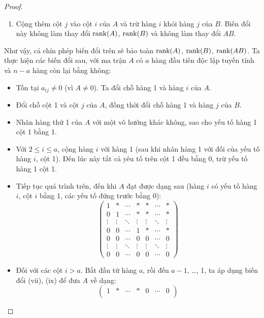 \documentclass[class=linear-algebra,crop=false]{standalone}
\begin{document}
\begin{proof}
\begin{enumerate}[label = (\roman*)]
		\item Cộng thêm cột $j$ vào cột $i$ của $A$ và trừ hàng $i$ khỏi hàng $j$ của $B$. Biến đổi này không làm thay đổi $\text{rank}(A)$, $\text{rank}(B)$ và không làm thay đổi $AB$.
	\end{enumerate}
	\par Như vậy, cả chín phép biến đổi trên sẽ bảo toàn $\text{rank}(A)$, $\text{rank}(B)$, $\text{rank}(AB)$. Ta thực hiện các biến đổi sau, với ma trận $A$ có $a$ hàng đầu tiên độc lập tuyến tính và $n - a$ hàng còn lại bằng không:
	\begin{itemize}
		\item Tồn tại $a_{ij}\ne 0$ (vì $A\ne 0$). Ta đổi chỗ hàng 1 và hàng $i$ của $A$.
		\item Đổi chỗ cột 1 và cột $j$ của $A$, đồng thời đổi chỗ hàng 1 và hàng $j$ của $B$.
		\item Nhân hàng thứ 1 của $A$ với một vô hướng khác không, sao cho yếu tố hàng 1 cột 1 bằng 1.
		\item Với $2\le i\le a$, cộng hàng $i$ với hàng 1 (sau khi nhân hàng 1 với đối của yếu tố hàng $i$, cột 1). Đến lúc này tất cả yêu tố trên cột 1 đều bằng 0, trừ yếu tố hàng 1 cột 1.
		\item Tiếp tục quá trình trên, đến khi $A$ đạt được dạng sau (hàng $i$ có yếu tố hàng $i$, cột $i$ bằng 1, các yếu tố đứng trước bằng 0):
		      \[
			      \begin{pmatrix}
				      1      & *      & \cdots & *      & *      & \cdots & *      \\
				      0      & 1      & \cdots & *      & *      & \cdots & *      \\
				      \vdots & \vdots & \ddots & \vdots & \vdots & \ddots & \vdots \\
				      0      & 0      & \cdots & 1      & *      & \cdots & *      \\
				      0      & 0      & \cdots & 0      & 0      & \cdots & 0      \\
				      \vdots & \vdots & \ddots & \vdots & \vdots & \ddots & \vdots \\
				      0      & 0      & \cdots & 0      & 0      & \cdots & 0
			      \end{pmatrix}
		      \]
		\item Đối với các cột $i > a$. Bắt đầu từ hàng $a$, rồi đến $a-1$, \ldots, 1, ta áp dụng biến đổi (vii), (ix) để đưa $A$ về dạng:
		      \[
			      \begin{pmatrix}
				      1      & *      & \cdots & *      & 0      & \cdots & 0      \\

\end{pmatrix}\]
\end{itemize}
\end{proof}
\end{document}
